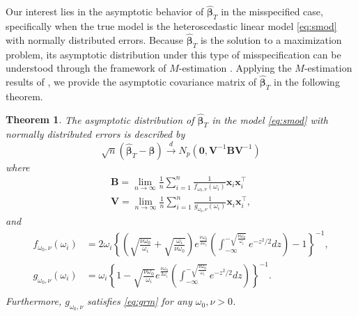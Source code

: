 \documentclass[12pt]{article}
\newtheorem{theorem}{Theorem}
\newcommand{\bl}[1]{{\mathbf #1}}
\newcommand{\bs}[1]{\boldsymbol #1}
\begin{document}
Our interest lies in the asymptotic behavior of $\hat{\bs{\beta}}_T$ in the misspecified case, specifically when the true model is the heteroscedastic linear model \eqref{eq:smod} with normally distributed errors. Because $\hat{\bs{\beta}}_T$ is the solution to a maximization problem, its asymptotic distribution under this type of misspecification can be understood through the framework of $M$-estimation \citep{huber_robust_1973, huber_robust_2009}. Applying the $M$-estimation results of \cite{stefanski_calculus_2002}, we provide the asymptotic covariance matrix of $\hat{\bs{\beta}}_T$ in the following theorem.
\begin{theorem}\label{thm:asymvar}
    The asymptotic distribution of $\hat{\bs{\beta}}_{T}$ in the model \eqref{eq:smod} with normally distributed errors is described by
    \begin{equation*}
        \sqrt{n}(\hat{\bs{\beta}}_{T} - \bs{\beta}) \overset{d}{\longrightarrow} N_p(\bl{0}, \bl{V}^{-1} \bl{B} \bl{V}^{-1})
    \end{equation*}
    where 
    \begin{equation*}
    \begin{aligned}
    	\bl{B} = \lim_{n \rightarrow \infty} \frac{1}{n}\sum_{i=1}^n \frac{1}{f_{\omega_0, \nu}(\omega_i)} \bl{x}_i \bl{x}_i^\top \\
    	\bl{V} = \lim_{n \rightarrow \infty} \frac{1}{n} \sum_{i=1}^n \frac{1}{g_{\omega_0, \nu}(\omega_i)} \bl{x}_i \bl{x}_i^\top,
    \end{aligned}
    \end{equation*}
    and
    \begin{equation*}
    \begin{aligned}
    f_{\omega_0, \nu}(\omega_i) &= 2\omega_i\left\{\left(\sqrt{\frac{\nu \omega_0}{\omega_i}} + \sqrt{\frac{\omega_i}{\nu \omega_0}} \right) e^{\frac{\nu \omega_0}{2\omega_i}} \left(\int_{-\infty}^{-\sqrt{\frac{\nu \omega_0}{\omega_i}}} e^{-z^2/2} dz\right) - 1 \right\}^{-1},\\
    g_{\omega_0, \nu}(\omega_i) &= \omega_i\left\{1 - \sqrt{\frac{\nu \omega_0}{\omega_i}} e^{\frac{\nu \omega_0}{2\omega_i}} \left( \int_{-\infty}^{-\sqrt{\frac{\nu \omega_0}{\omega_i}}} e^{-z^2/2} dz \right)\right\}^{-1}. \\
    \end{aligned}
    \end{equation*}
    Furthermore, $g_{\omega_0, \nu}$ satisfies \eqref{eq:grm} for any $\omega_0, \nu > 0$.
\end{theorem}
\end{document}

